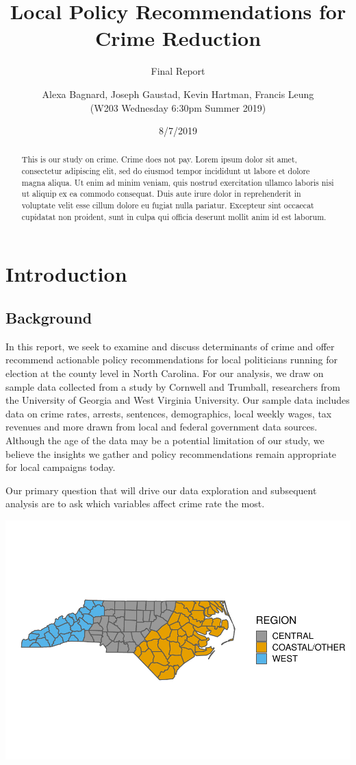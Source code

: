 \documentclass[]{article}
\title{Local Policy Recommendations for Crime Reduction}
\subtitle{Final Report}
\author{Alexa Bagnard, Joseph Gaustad, Kevin Hartman, Francis Leung \\ (W203 Wednesday 6:30pm Summer 2019)}
\date{8/7/2019}
\begin{document}
\maketitle
\begin{abstract}
This is our study on crime. Crime does not pay. Lorem ipsum dolor sit
amet, consectetur adipiscing elit, sed do eiusmod tempor incididunt ut
labore et dolore magna aliqua. Ut enim ad minim veniam, quis nostrud
exercitation ullamco laboris nisi ut aliquip ex ea commodo consequat.
Duis aute irure dolor in reprehenderit in voluptate velit esse cillum
dolore eu fugiat nulla pariatur. Excepteur sint occaecat cupidatat non
proident, sunt in culpa qui officia deserunt mollit anim id est laborum.
\end{abstract}

{
\setcounter{tocdepth}{2}
\tableofcontents
}
\hypertarget{introduction}{%
\section{Introduction}\label{introduction}}

\hypertarget{background}{%
\subsection{Background}\label{background}}

In this report, we seek to examine and discuss determinants of crime and
offer recommend actionable policy recommendations for local politicians
running for election at the county level in North Carolina. For our
analysis, we draw on sample data collected from a study by Cornwell and
Trumball, researchers from the University of Georgia and West Virginia
University. Our sample data includes data on crime rates, arrests,
sentences, demographics, local weekly wages, tax revenues and more drawn
from local and federal government data sources. Although the age of the
data may be a potential limitation of our study, we believe the insights
we gather and policy recommendations remain appropriate for local
campaigns today.

Our primary question that will drive our data exploration and subsequent
analysis are to ask which variables affect crime rate the most.

\includegraphics{Bagnard_Gaustad_Hartman_Leung_Lab_3_files/figure-latex/unnamed-chunk-1-1.pdf}
\end{document}
